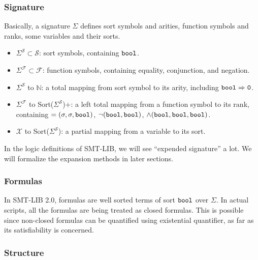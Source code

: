 \documentclass[10pt,letter]{article}
\theoremstyle{definition}
\begin{document}
\subsubsection{Signature}

Basically, a signature $\Sigma$ defines sort symbols and arities, function symbols and ranks, some variables and their sorts.

\begin{itemize}
\item $\Sigma^\mathcal{S} \subset \mathcal{S}$: sort symbols, containing $\tt bool$.
\item $\Sigma^\mathcal{F} \subset \mathcal{F}$: function symbols, containing equality, conjunction, and negation.
\item $\Sigma^\mathcal{S}$ to $\mathbb{N}$: a total mapping from sort symbol to its arity, including $\tt bool \Rightarrow 0$.
\item $\Sigma^\mathcal{F}$ to Sort($\Sigma^\mathcal{S}$)$+$: a left total mapping from a function symbol to its rank, containing $=(\sigma, \sigma, {\tt bool} )$, $\neg({\tt bool},{\tt bool})$, $\wedge ({\tt bool}, {\tt bool}, {\tt bool})$.
\item $\mathcal{X}$ to Sort($\Sigma^\mathcal{S}$): a partial mapping from a variable to its sort.
\end{itemize}

In the logic definitions of SMT-LIB, we will see ``expended signature'' a lot. We will formalize the expansion methods in later sections.

\subsubsection{Formulas}

In SMT-LIB 2.0, formulas are well sorted terms of sort $\tt bool$ over $\Sigma$. In actual scripts, all the formulas are being treated as closed formulas. This is possible since non-closed formulas can be quantified using existential quantifier, as far as its satisfiability is concerned.

\subsubsection{Structure}
\end{document}
